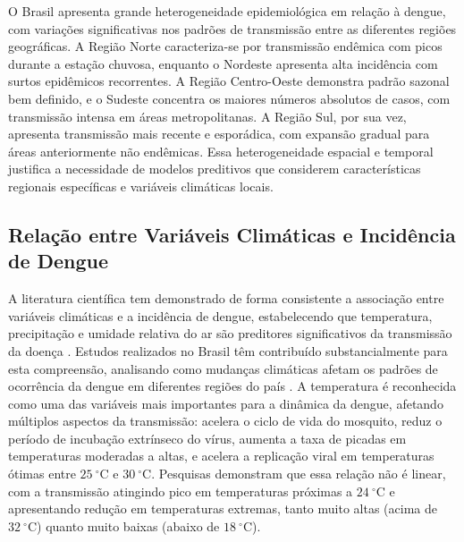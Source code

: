 O Brasil apresenta grande heterogeneidade epidemiológica em relação à dengue, com variações significativas nos padrões de transmissão entre as diferentes regiões geográficas. A Região Norte caracteriza-se por transmissão endêmica com picos durante a estação chuvosa, enquanto o Nordeste apresenta alta incidência com surtos epidêmicos recorrentes. A Região Centro-Oeste demonstra padrão sazonal bem definido, e o Sudeste concentra os maiores números absolutos de casos, com transmissão intensa em áreas metropolitanas. A Região Sul, por sua vez, apresenta transmissão mais recente e esporádica, com expansão gradual para áreas anteriormente não endêmicas. Essa heterogeneidade espacial e temporal justifica a necessidade de modelos preditivos que considerem características regionais específicas e variáveis climáticas locais.

\subsection{Relação entre Variáveis Climáticas e Incidência de Dengue}

A literatura científica tem demonstrado de forma consistente a associação entre variáveis climáticas e a incidência de dengue, estabelecendo que temperatura, precipitação e umidade relativa do ar são preditores significativos da transmissão da doença \cite{analysis_climate_factors_dengue,the_occurrence_dengue_weather_brazil}. Estudos realizados no Brasil têm contribuído substancialmente para esta compreensão, analisando como mudanças climáticas afetam os padrões de ocorrência da dengue em diferentes regiões do país \cite{the_occurrence_dengue_weather_brazil,health_impact_dengue_precipitation_sp}. A temperatura é reconhecida como uma das variáveis mais importantes para a dinâmica da dengue, afetando múltiplos aspectos da transmissão: acelera o ciclo de vida do mosquito, reduz o período de incubação extrínseco do vírus, aumenta a taxa de picadas em temperaturas moderadas a altas, e acelera a replicação viral em temperaturas ótimas entre $25~^\circ\mathrm{C}$ e $30~^\circ\mathrm{C}$. Pesquisas demonstram que essa relação não é linear, com a transmissão atingindo pico em temperaturas próximas a $24~^\circ\mathrm{C}$ e apresentando redução em temperaturas extremas, tanto muito altas (acima de $32~^\circ\mathrm{C}$) quanto muito baixas (abaixo de $ 18~^\circ\mathrm{C}$).

